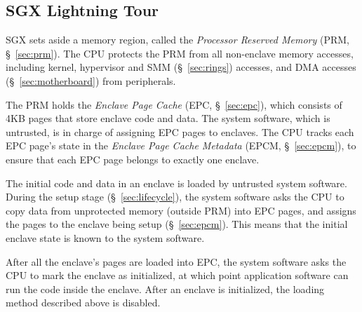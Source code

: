 \subsection{SGX Lightning Tour}
\label{sec:intro_sgx}

SGX sets aside a memory region, called the \textit{Processor Reserved Memory}
(PRM, \S~\ref{sec:prm}). The CPU protects the PRM from all non-enclave memory
accesses, including kernel, hypervisor and SMM (\S~\ref{sec:rings}) accesses,
and DMA accesses (\S~\ref{sec:motherboard}) from peripherals.

The PRM holds the \textit{Enclave Page Cache} (EPC, \S~\ref{sec:epc}), which
consists of 4KB pages that store enclave code and data. The system software,
which is untrusted, is in charge of assigning EPC pages to enclaves. The CPU
tracks each EPC page's state in the \textit{Enclave Page Cache Metadata} (EPCM,
\S~\ref{sec:epcm}), to ensure that each EPC page belongs to exactly one
enclave.

The initial code and data in an enclave is loaded by untrusted system software.
During the setup stage (\S~\ref{sec:lifecycle}), the system software asks the
CPU to copy data from unprotected memory (outside PRM) into EPC pages, and
assigns the pages to the enclave being setup (\S~\ref{sec:epcm}). This
means that the initial enclave state is known to the system software.

After all the enclave's pages are loaded into EPC, the system software asks the
CPU to mark the enclave as initialized, at which point application software can
run the code inside the enclave. After an enclave is initialized, the loading
method described above is disabled.



